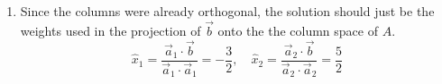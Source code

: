 \begin{enumerate}
\begin{enumerate}
					Row-reduce the augmented matrix to reach to the solution. 
					\[\left(\!\!\begin{array}{cc|c}2 & 2 & 1 \\ 0 & 1 & 3\end{array}\!\!\right) 
					  \sim \left(\!\!\begin{array}{cc|c}2 & 0 & -5 \\ 0 & 1 & 3\end{array}\!\!\right)
					  \sim \left(\!\!\begin{array}{cc|c}1 & 0 & -5/2 \\ 0 & 1 & 3\end{array}\!\!\right).\]
					We get that \(\vec{\hat{x}} = \begin{bmatrix}-5/2 \\ 3\end{bmatrix}\).

				\item Since the columns were already orthogonal, the solution should just be the weights used in the projection of \(\vec{b}\) onto the
					the column space of \(A\). 
					\[\hat{x}_1 = \frac{\vec{a}_1 \cdot \vec{b}}{\vec{a}_1 \cdot \vec{a}_1} = -\frac{3}{2}, \quad 
					   \hat{x}_2 = \frac{\vec{a}_2 \cdot \vec{b}}{\vec{a}_2 \cdot \vec{a}_2} =\frac{5}{2}\]
			\end{enumerate}
	\end{enumerate}